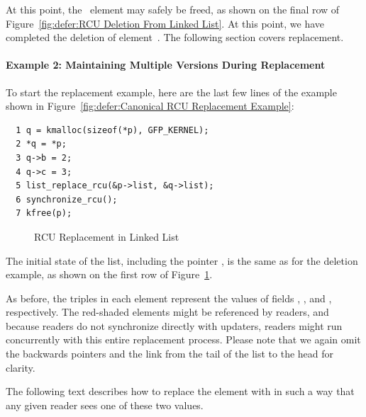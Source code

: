 At this point, the ~element may safely be
freed, as shown on the final row of
Figure~\ref{fig:defer:RCU Deletion From Linked List}.
At this point, we have completed the deletion of
element~.
The following section covers replacement.

\paragraph{Example 2: Maintaining Multiple Versions During Replacement}
\label{sec:defer:Example 2: Maintaining Multiple Versions During Replacement}

To start the replacement example,
here are the last few lines of the
example shown in
Figure~\ref{fig:defer:Canonical RCU Replacement Example}:

\vspace{5pt}
\begin{minipage}[t]{\columnwidth}
\scriptsize
\begin{verbatim}
  1 q = kmalloc(sizeof(*p), GFP_KERNEL);
  2 *q = *p;
  3 q->b = 2;
  4 q->c = 3;
  5 list_replace_rcu(&p->list, &q->list);
  6 synchronize_rcu();
  7 kfree(p);
\end{verbatim}
\end{minipage}
\vspace{5pt}

\begin{figure}[tbp]
\begin{center}
\end{center}
\caption{RCU Replacement in Linked List}
\label{fig:defer:RCU Replacement in Linked List}
\end{figure}

The initial state of the list, including the pointer ,
is the same as for the deletion example, as shown on the
first row of
Figure~\ref{fig:defer:RCU Replacement in Linked List}.

As before,
the triples in each element represent the values of fields ,
, and , respectively.
The red-shaded elements might be referenced by readers,
and because readers do not synchronize directly with updaters,
readers might run concurrently with this entire replacement process.
Please note that
we again omit the backwards pointers and the link from the tail
of the list to the head for clarity.

The following text describes how to replace the  element
with  in such a way that any given reader sees one of these
two values.

